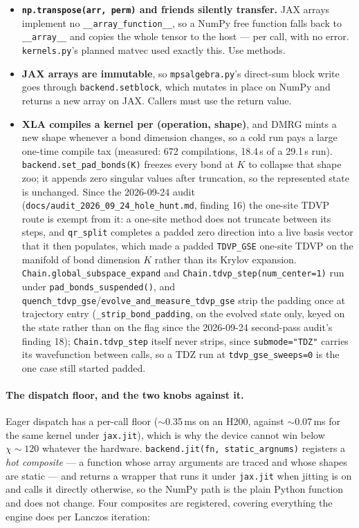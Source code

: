 \documentclass[11pt]{article}
\begin{document}
\begin{itemize}
  \item \textbf{\texttt{np.transpose(arr, perm)} and friends silently
    transfer.} JAX arrays implement no \texttt{\_\_array\_function\_\_},
    so a NumPy free function falls back to \texttt{\_\_array\_\_} and
    copies the whole tensor to the host --- per call, with no error.
    \texttt{kernels.py}'s planned matvec used exactly this. Use methods.
  \item \textbf{JAX arrays are immutable}, so \texttt{mpsalgebra.py}'s
    direct-sum block write goes through \texttt{backend.setblock}, which
    mutates in place on NumPy and returns a new array on JAX. Callers
    must use the return value.
  \item \textbf{XLA compiles a kernel per (operation, shape)}, and DMRG
    mints a new shape whenever a bond dimension changes, so a cold run
    pays a large one-time compile tax (measured: 672 compilations,
    18.4\,s of a 29.1\,s run). \texttt{backend.set\_pad\_bonds(K)}
    freezes every bond at $K$ to collapse that shape zoo; it appends zero
    singular values after truncation, so the represented state is
    unchanged. Since the 2026-09-24 audit
    (\texttt{docs/audit\_2026\_09\_24\_hole\_hunt.md}, finding 16) the
    one-site TDVP route is exempt from it: a one-site method does not
    truncate between its steps, and \texttt{qr\_split} completes a
    padded zero direction into a live basis vector that it then
    populates, which made a padded \texttt{TDVP\_GSE} one-site TDVP on
    the manifold of bond dimension $K$ rather than its Krylov expansion.
    \texttt{Chain.global\_subspace\_expand} and
    \texttt{Chain.tdvp\_step(num\_center=1)} run under
    \texttt{pad\_bonds\_suspended()}, and
    \texttt{quench\_tdvp\_gse}/\texttt{evolve\_and\_measure\_tdvp\_gse}
    strip the padding once at trajectory entry
    (\texttt{\_strip\_bond\_padding}, on the evolved state only, keyed
    on the state rather than on the flag since the 2026-09-24
    second-pass audit's finding 18);
    \texttt{Chain.tdvp\_step} itself never strips, since
    \texttt{submode="TDZ"} carries its wavefunction between calls, so a
    TDZ run at \texttt{tdvp\_gse\_sweeps=0} is the one case still
    started padded.
\end{itemize}

\paragraph{The dispatch floor, and the two knobs against it.} Eager
dispatch has a per-call floor ($\sim$0.35\,ms on an H200, against
$\sim$0.07\,ms for the same kernel under \texttt{jax.jit}), which is why
the device cannot win below $\chi \sim 120$ whatever the hardware.
\texttt{backend.jit(fn, static\_argnums)} registers a \emph{hot
composite} --- a function whose array arguments are traced and whose
shapes are static --- and returns a wrapper that runs it under
\texttt{jax.jit} when jitting is on and calls it directly otherwise, so
the NumPy path is the plain Python function and does not change. Four
composites are registered, covering everything the engine does per
Lanczos iteration:
\end{document}
